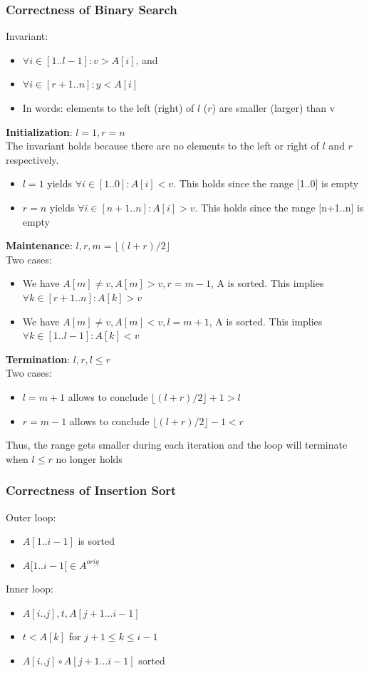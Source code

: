 \subsubsection{Correctness of Binary Search}

Invariant: 
\begin{itemize}
    \item $\forall i \in [1..l-1]:v>A[i]$, and
    \item $\forall i \in [r+1..n]:y < A[i]$
    \item In words: elements to the left (right) of $l$ ($r$) are smaller (larger) than v 
\end{itemize}

\textbf{Initialization}: $l=1,r=n$ \\
The invariant holds because there are no elements to the left or right of $l$ and $r$ respectively.
\begin{itemize}
    \item $l=1$ yields $\forall i \in [1..0]:A[i] < v$. This holds since the range [1..0] is empty
    \item $r=n$ yields $\forall i \in [n+1..n]:A[i]>v$. This holds since the range [n+1..n] is empty
\end{itemize}
\textbf{Maintenance}: $l,r,m = \lfloor (l+r)/2 \rfloor $\\
Two cases:
\begin{itemize}
    \item We have $A[m]\neq v, A[m] > v, r=m-1 $, A is sorted. This implies $\forall k \in [r+1..n]:A[k]>v$
    \item We have $A[m] \neq v, A[m] < v, l=m+1 $, A is sorted. This implies $\forall k \in [1..l-1]:A[k]<v $
\end{itemize}

\textbf{Termination}: $l,r,l \leq r$\\
Two cases:
\begin{itemize}
    \item $l=m+1$ allows to conclude $\lfloor(l+r)/2\rfloor +1 >l $
    \item $r=m-1$ allows to conclude $\lfloor(l+r)/2\rfloor -1 < r $
\end{itemize}
Thus, the range gets smaller during each iteration and the loop will terminate when $l\leq r$ no longer holds

\subsubsection{Correctness of Insertion Sort}
Outer loop:
\begin{itemize}
    \item $A[1..i-1]$ is sorted
    \item $A[1..i-1[ \in A^{orig}$ 
\end{itemize}
Inner loop:
\begin{itemize}
    \item $A[i..j],t,A[j+1...i-1]$
    \item $t<A[k]$ for $j+1\leq k \leq i-1$
    \item $A[i..j] \circ A[j+1...i-1]$ sorted
\end{itemize}

